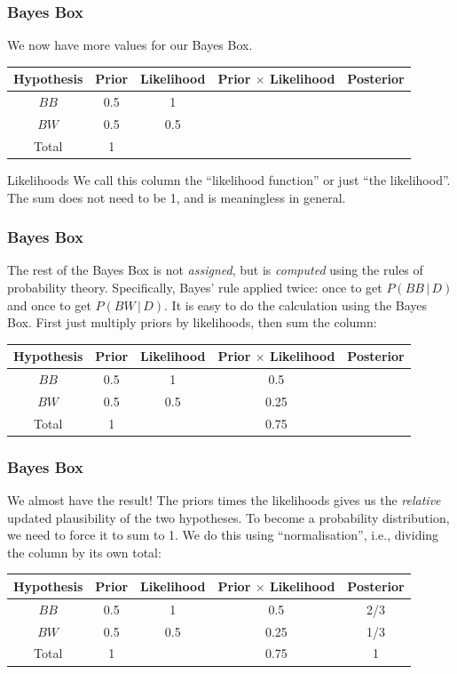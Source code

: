 \documentclass{beamer}
\newcommand{\given}{\,|\,}
\begin{document}
\begin{frame}
\frametitle{Bayes Box}
We now have more values for our Bayes Box.\\[0.5em]\pause
\begin{tabular}{|c|c|c|c|c|}
\hline
Hypothesis & Prior & Likelihood & Prior $\times$ Likelihood & Posterior \\
\hline
$BB$ & 0.5 & 1 & & \\
$BW$ & 0.5 & 0.5 & & \\
\hline
Total & 1 & & & \\
\hline
\end{tabular}\pause

\begin{alertblock}{Likelihoods}
We call this column the ``likelihood function'' or just ``the likelihood''.
The sum does not need to be 1, and is meaningless in
general.
\end{alertblock}

\end{frame}


\begin{frame}
\frametitle{Bayes Box}
The rest of the Bayes Box is not {\em assigned}, but is {\em computed}
using the rules of probability theory. Specifically, Bayes' rule applied
twice: once to get $P(BB \given D)$ and once to get $P(BW \given D)$.
It is easy to do the calculation using the Bayes Box. First just multiply
priors by likelihoods, then sum the column:
\\[0.5em]\pause
\begin{tabular}{|c|c|c|c|c|}
\hline
Hypothesis & Prior & Likelihood & Prior $\times$ Likelihood & Posterior \\
\hline
$BB$ & 0.5 & 1 & 0.5 & \\
$BW$ & 0.5 & 0.5 & 0.25 & \\
\hline
Total & 1 & & 0.75 & \\
\hline
\end{tabular}\pause



\end{frame}


\begin{frame}
\frametitle{Bayes Box}
We almost have the result! The priors times the likelihoods gives us the
{\em relative} updated plausibility of the two hypotheses. To become a
probability distribution, we need to force it to sum to 1. We do this
using ``normalisation'', i.e., dividing the column by its own total:\\[0.5em]\pause
\begin{tabular}{|c|c|c|c|c|}
\hline
Hypothesis & Prior & Likelihood & Prior $\times$ Likelihood & Posterior \\
\hline
$BB$ & 0.5 & 1 & 0.5 & 2/3 \\
$BW$ & 0.5 & 0.5 & 0.25 & 1/3 \\
\hline
Total & 1 & & 0.75 & 1\\
\hline
\end{tabular}\pause



\end{frame}
\end{document}
